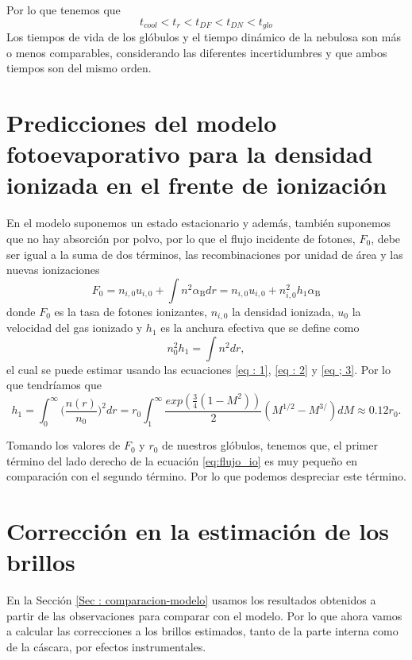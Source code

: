 \documentclass{book}
\begin{document}
Por lo que tenemos que
\begin{equation}
    t_{cool} < t_r < t_{DF} < t_{DN} < t_{glo}
\end{equation}
Los tiempos de vida de los glóbulos y el tiempo dinámico de la nebulosa son más o menos comparables, considerando las diferentes incertidumbres y que ambos tiempos son del mismo orden. 

\chapter{Predicciones del modelo fotoevaporativo para la densidad ionizada en el frente de ionización }\label{App : tasa de fotoionizacion}

En el modelo suponemos un estado estacionario y además, también suponemos que no hay absorción por polvo, por lo que el flujo incidente de fotones, $F_0$, debe ser igual a la suma de dos términos, las recombinaciones por unidad de área y las nuevas ionizaciones
\begin{equation}
F_0 = n_{i,0} u_{i,0} +\int n^2\alpha_\mathrm{B}dr = n_{i,0}u_{i,0}+n_{i,0}^2h_1\alpha_\mathrm{B}
\end{equation}\label{eq:flujo_io}
donde $F_0$ es la tasa de fotones ionizantes, $n_{i,0}$ la densidad ionizada, $u_0$ la velocidad del gas ionizado y $h_1$ es la anchura efectiva que se define como
\begin{equation}
n_0^2h_1=\int n^2dr,
\end{equation}
el cual se puede estimar usando las ecuaciones  \ref{eq : 1}, \ref{eq : 2} y \ref{eq ; 3}. Por lo que tendríamos que 
\begin{equation}
h_1=\int_0^\infty \Big(\frac{n(r)}{n_0}\Big)^2dr=r_0\int_1^\infty\frac{exp(\frac{3}{4}(1-M^2))}{2}(M^{1/2}-M^{3/})dM\approx0.12r_0.\end{equation}

Tomando los valores de $F_0$ y $r_0$ de nuestros glóbulos, tenemos que, el primer término del lado derecho de la ecuación \ref{eq:flujo_io} es muy pequeño en comparación con el segundo término. Por lo que podemos despreciar este término.

\chapter{Corrección en la estimación de los brillos}\label{App:brillos}

En la Sección \ref{Sec : comparacion-modelo} usamos los resultados obtenidos a partir de las observaciones para comparar con el modelo. Por lo que ahora vamos a calcular las correcciones a los brillos estimados, tanto de la parte interna como de la cáscara, por efectos instrumentales.
\end{document}
